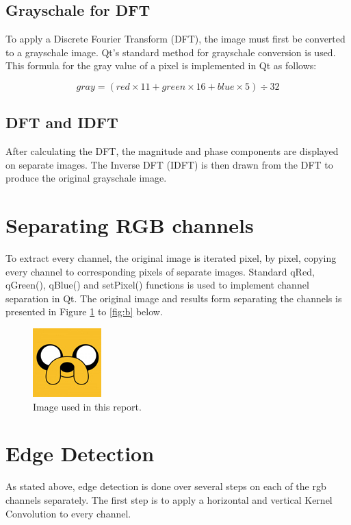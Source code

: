 \documentclass[a4paper,12pt]{article}
\numberwithin{equation}{section} %
\numberwithin{figure}{section}
\begin{document}
\subsection{Grayschale for DFT}
To apply a Discrete Fourier Transform (DFT), the image must first be converted to a grayschale image. Qt's standard method for grayschale conversion is used. This formula for the gray value of a pixel is implemented in Qt as follows:

\begin{equation}
	gray = (red \times 11 + green \times 16 + blue \times 5) \div 32
\end{equation}

\subsection{DFT and IDFT}
After calculating the DFT, the magnitude and phase components are displayed on separate images. The Inverse DFT (IDFT) is then drawn from the DFT to produce the original grayschale image.


\section{Separating RGB channels}
To extract every channel, the original image is iterated pixel, by pixel, copying every channel to corresponding pixels of separate images. Standard qRed, qGreen(), qBlue() and setPixel() functions is used to implement channel separation in Qt. The original image and results form separating the channels is presented in Figure \ref{fig:original} to \ref{fig:b} below.

\begin{figure}[H]
    \centering
    \includegraphics[scale=1.2]{original.png}
    \caption[Original Image]{Image used in this report.}
    \label{fig:original}
\end{figure}


\section{Edge Detection}
As stated above, edge detection is done over several steps on each of the  rgb channels separately. The first step is to apply a horizontal and vertical Kernel Convolution to every channel.
\end{document}
